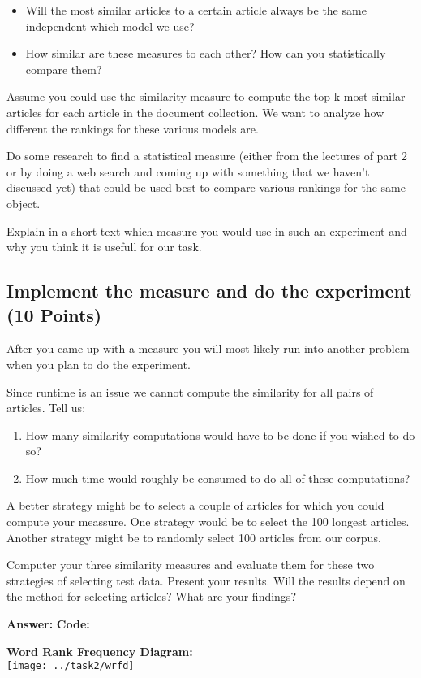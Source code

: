 \documentclass{WeSTassignment}
\begin{document}
\begin{itemize}
\item Will the most similar articles to a certain article always be the same independent which model we use?
\item How similar are these measures to each other? How can you statistically compare them?
\end{itemize}

Assume you could use the similarity measure to compute the top k most similar articles for each article in the document collection. We want to analyze how different the rankings for these various models are. 

Do some research to find a statistical measure (either from the lectures of part 2 or by doing a web search and coming up with something that we haven't discussed yet) that could be used best to compare various rankings for the same object. 

Explain in a short text which measure you would use in such an experiment and why you think it is usefull for our task. 

\subsection{Implement the measure and do the experiment (10 Points)}
After you came up with a measure you will most likely run into another problem when you plan to do the experiment. 

Since runtime is an issue we cannot compute the similarity for all pairs of articles. Tell us: 
\begin{enumerate}
\item How many similarity computations would have to be done if you wished to do so? 
\item How much time would roughly be consumed to do all of these computations?
\end{enumerate}

A better strategy might be to select a couple of articles for which you could compute your meassure. One strategy would be to select the 100 longest articles. Another strategy might be to randomly select 100 articles from our corpus. 

Computer your three similarity measures and evaluate them for these two strategies of selecting test data. Present your results. Will the results depend on the method for selecting articles? What are your findings?

\textbf{Answer:}
\textbf{Code:}

\textbf{Word Rank Frequency Diagram:}\\
\hspace*{-100px}
\texttt{[image: ../task2/wrfd]}
\end{document}
